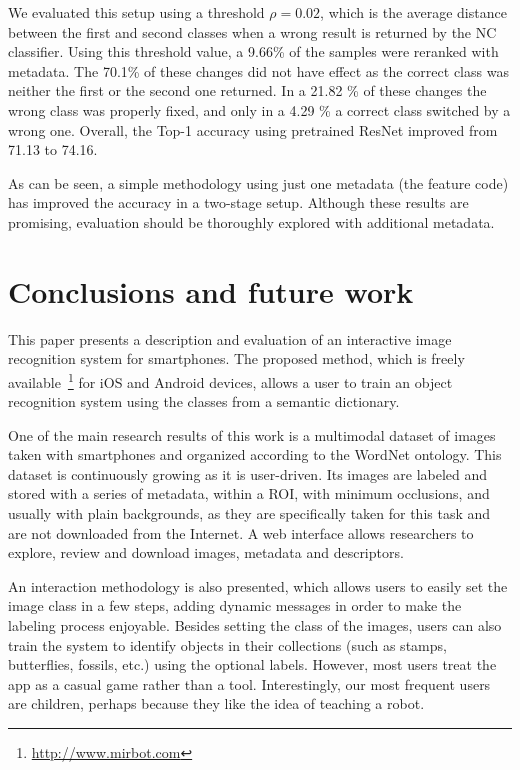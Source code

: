 \documentclass[final, twocolumn]{elsarticle}
\begin{document}
We evaluated this setup using a threshold $\rho = 0.02$, which is the average distance between the first and second classes when a wrong result is returned by the NC  classifier. Using this threshold value, a 9.66\% of the samples were reranked with metadata. The 70.1\% of these changes did not have effect as the correct class was neither the first or the second one returned. In a 21.82 \% of these changes the wrong class was properly fixed, and only in a 4.29 \% a correct class switched by a wrong one. Overall, the Top-1 accuracy using pretrained ResNet improved from 71.13 to 74.16.

As can be seen, a simple methodology using just one metadata (the feature code) has  improved the accuracy in a two-stage setup. Although these results are promising, evaluation should be thoroughly explored with additional metadata.




\section{Conclusions and future work}
\label{conclusions}

This paper presents a description and evaluation of an interactive image recognition system for smartphones. The proposed method, which is freely available~\footnote{\url{http://www.mirbot.com}} for iOS and Android devices, allows a user to train an object recognition system using the classes from a semantic dictionary.

One of the main research results of this work is a multimodal dataset of images taken with smartphones and organized according to the WordNet ontology. This dataset is continuously growing as it is user-driven. Its images are labeled and stored with a series of metadata, within a ROI, with minimum occlusions, and usually with plain backgrounds, as they are specifically taken for this task and are not downloaded from the Internet. A web interface allows researchers to explore, review and download images, metadata and descriptors.

An interaction methodology is also presented, which allows users to easily set the image class in a few steps, adding dynamic messages in order to make the labeling process enjoyable. Besides setting the class of the images, users can also train the system to identify objects in their collections (such as stamps, butterflies, fossils, etc.) using the optional labels. However, most users treat the app as a casual game rather than a tool. Interestingly, our most frequent users are children, perhaps because they like the idea of teaching a robot.
\end{document}
